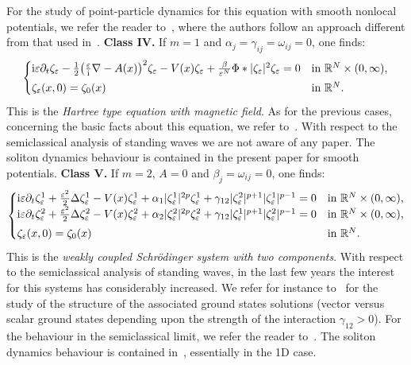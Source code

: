 \documentclass[11pt]{amsart}
\numberwithin{equation}{section}
\theoremstyle{definition}
\begin{document}
For the study of point-particle dynamics for this equation with
smooth nonlocal potentials, we refer the reader to~\cite{yau}, where the authors follow an
approach different from that used in~\cite{bronski,Keerani2}.
\vskip4pt
\noindent
{\bf Class IV.}
If $m=1$ and $\alpha_j=\gamma_{ij}=\omega_{ij}=0$, one finds:
    \begin{equation*}
    \begin{cases}       {{\rm i}}{\varepsilon}\partial_t\zeta_{\varepsilon}-\frac{1}{2}\big(\frac{\varepsilon}{{\rm i}}\nabla-A(x)\big)^2\zeta_{\varepsilon}-V(x)\zeta_{\varepsilon}
        +\frac{\beta}{{\varepsilon}^N}\Phi*|\zeta_{\varepsilon}|^{2}\zeta_{\varepsilon}=0 & \text{in ${{\mathbb R}}^N\times(0,\infty)$,} \\
        \noalign{\vskip3pt}
        \zeta_{\varepsilon}(x,0)=\zeta_0(x) & \text{in ${{\mathbb R}}^N$}.
    \end{cases}
\end{equation*}
This is the {\em Hartree type equation with magnetic field}. As for the previous cases,
concerning the basic facts about this equation, we refer to~\cite{cazenave}. With respect
to the semiclassical analysis of standing waves we are not aware of any paper. The soliton dynamics
behaviour is contained in the present paper for smooth potentials.
\vskip4pt
\noindent
{\bf Class V.} If $m=2$, $A=0$ and $\beta_j=\omega_{ij}=0$, one finds:
\begin{equation*}
    \begin{cases}
        {{\rm i}}{\varepsilon}\partial_t\zeta_{\varepsilon}^1+\frac{{\varepsilon}^2}{2}\Delta\zeta_{\varepsilon}^1-V(x)\zeta_{\varepsilon}^1
        +\alpha_1|\zeta_{\varepsilon}^1|^{2p}\zeta_{\varepsilon}^1+\gamma_{12}|\zeta_{\varepsilon}^2|^{p+1}|\zeta_{\varepsilon}^1|^{p-1}=0 &
        \text{in ${{\mathbb R}}^N\times(0,\infty)$,} \\
        {{\rm i}}{\varepsilon}\partial_t\zeta_{\varepsilon}^2+\frac{{\varepsilon}^2}{2}\Delta\zeta_{\varepsilon}^2-V(x)\zeta_{\varepsilon}^2
        +\alpha_2|\zeta_{\varepsilon}^2|^{2p}\zeta_{\varepsilon}^2+\gamma_{12}|\zeta_{\varepsilon}^1|^{p+1}|\zeta_{\varepsilon}^2|^{p-1}=0 &
        \text{in ${{\mathbb R}}^N\times(0,\infty)$,} \\
        \noalign{\vskip3pt}
        \zeta_{\varepsilon}(x,0)=\zeta_0(x) & \text{in ${{\mathbb R}}^N$}.
    \end{cases}
\end{equation*}
This is the {\em weakly coupled Schr\"odinger system with two components}. With respect
to the semiclassical analysis of standing waves, in the last few years the interest for
this systems has considerably increased. We refer for instance to~\cite{aCol,lw,mps,sirakov}
for the study of the structure of the associated ground states solutions (vector versus scalar
ground states depending upon the strength of the interaction $\gamma_{12}>0$). For the behaviour in the semiclassical limit,
we refer the reader to~\cite{dw,mps}. The soliton dynamics behaviour is contained in~\cite{squamont,mmp3},
essentially in the 1D case.
\end{document}
